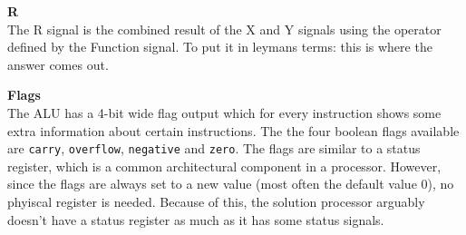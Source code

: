 \begin{description}
\item{\textbf{R}} \\
The R signal is the combined result of the X and Y signals using the operator defined by the Function signal.
To put it in leymans terms: this is where the answer comes out.

\item{\textbf{Flags}} \\
The ALU has a 4-bit wide flag output which for every instruction shows some extra information about certain instructions.
The the four boolean flags available are \texttt{carry}, \texttt{overflow}, \texttt{negative} and \texttt{zero}.
The flags are similar to a status register, which is a common architectural component in a processor.
However, since the flags are always set to a new value (most often the default value $ 0 $), no phyiscal register is needed.
Because of this, the solution processor arguably doesn't have a status register as much as it has some status signals.

\end{description}
